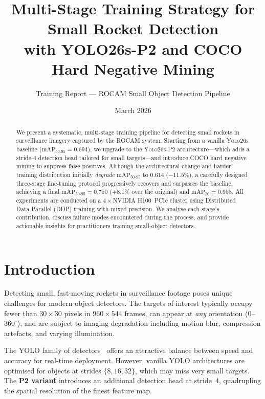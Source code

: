 \documentclass[11pt, a4paper]{article}
\newcommand{\mapfifty}{\text{mAP}_{50}}
\newcommand{\mapfull}{\text{mAP}_{50\text{-}95}}
\newcommand{\yolobase}{\textsc{Yolo26s}}
\newcommand{\yolop}{\textsc{Yolo26s-P2}}
\begin{document}
\title{%
  \textbf{Multi-Stage Training Strategy for Small Rocket Detection\\
    with YOLO26s-P2 and COCO Hard Negative Mining}}
\author{%
  Training Report --- ROCAM Small Object Detection Pipeline
}
\date{March 2026}
\maketitle

\begin{abstract}
  We present a systematic, multi-stage training pipeline for detecting
  small rockets in surveillance imagery captured by the ROCAM system.
  Starting from a vanilla \yolobase{} baseline
  ($\mapfull = 0.694$), we upgrade to the \yolop{} architecture---which
  adds a stride-4 detection head tailored for small targets---and
  introduce COCO hard negative mining to suppress false positives.
  Although the architectural change and harder training distribution
  initially \emph{degrade} $\mapfull$ to $0.614$ ($-11.5\%$), a
  carefully designed three-stage fine-tuning protocol progressively
  recovers and surpasses the baseline, achieving a final
  $\mapfull = 0.750$ ($+8.1\%$ over the original) and
  $\mapfifty = 0.958$.  All experiments are conducted on a
  $4{\times}$NVIDIA H100~PCIe cluster using Distributed Data Parallel
  (DDP) training with mixed precision.  We analyse each stage's
  contribution, discuss failure modes encountered during the process,
  and provide actionable insights for practitioners training small-object
  detectors.
\end{abstract}

\section{Introduction}
\label{sec:intro}

Detecting small, fast-moving rockets in surveillance footage poses unique
challenges for modern object detectors. The targets of interest typically
occupy fewer than $30{\times}30$ pixels in $960{\times}544$ frames, can appear
at \emph{any} orientation ($0$--$360^{\circ}$), and are subject to imaging
degradation including motion blur, compression artefacts, and varying
illumination.

The YOLO family of detectors~\cite{ultralytics2025yolo} offers an attractive
balance between speed and accuracy for real-time deployment. However, vanilla
YOLO architectures are optimised for objects at strides $\{8, 16, 32\}$, which
may miss very small targets. The \textbf{P2 variant} introduces an additional
detection head at stride~$4$, quadrupling the spatial resolution of the finest
feature map.
\end{document}
